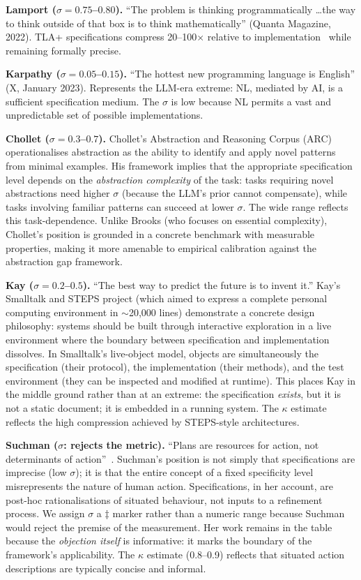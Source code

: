 \documentclass[11pt, a4paper, logo, copyright]{googledeepmind}
\begin{document}
\textbf{Lamport ($\sigma = 0.75$--$0.80$).} ``The problem is thinking programmatically \ldots the way to think outside of that box is to think mathematically'' (Quanta Magazine, 2022). TLA+ specifications compress 20--100$\times$ relative to implementation~\citep{newcombe2015amazon} while remaining formally precise.

\textbf{Karpathy ($\sigma = 0.05$--$0.15$).} ``The hottest new programming language is English'' (X, January 2023). Represents the LLM-era extreme: NL, mediated by AI, is a sufficient specification medium. The $\sigma$ is low because NL permits a vast and unpredictable set of possible implementations.

\textbf{Chollet ($\sigma = 0.3$--$0.7$).} Chollet's Abstraction and Reasoning Corpus (ARC)~\citep{chollet2019measure} operationalises abstraction as the ability to identify and apply novel patterns from minimal examples. His framework implies that the appropriate specification level depends on the \emph{abstraction complexity} of the task: tasks requiring novel abstractions need higher $\sigma$ (because the LLM's prior cannot compensate), while tasks involving familiar patterns can succeed at lower $\sigma$. The wide range reflects this task-dependence. Unlike Brooks (who focuses on essential complexity), Chollet's position is grounded in a concrete benchmark with measurable properties, making it more amenable to empirical calibration against the abstraction gap framework.

\textbf{Kay ($\sigma = 0.2$--$0.5$).} ``The best way to predict the future is to invent it.'' Kay's Smalltalk and STEPS project (which aimed to express a complete personal computing environment in $\sim$20,000 lines) demonstrate a concrete design philosophy: systems should be built through interactive exploration in a live environment where the boundary between specification and implementation dissolves. In Smalltalk's live-object model, objects are simultaneously the specification (their protocol), the implementation (their methods), and the test environment (they can be inspected and modified at runtime). This places Kay in the middle ground rather than at an extreme: the specification \emph{exists}, but it is not a static document; it is embedded in a running system. The $\kappa$ estimate reflects the high compression achieved by STEPS-style architectures.

\textbf{Suchman ($\sigma$: rejects the metric).} ``Plans are resources for action, not determinants of action''~\citep{suchman1987plans}. Suchman's position is not simply that specifications are imprecise (low $\sigma$); it is that the entire concept of a fixed specificity level misrepresents the nature of human action. Specifications, in her account, are post-hoc rationalisations of situated behaviour, not inputs to a refinement process. We assign $\sigma$ a $\ddagger$ marker rather than a numeric range because Suchman would reject the premise of the measurement. Her work remains in the table because the \emph{objection itself} is informative: it marks the boundary of the framework's applicability. The $\kappa$ estimate (0.8--0.9) reflects that situated action descriptions are typically concise and informal.
\end{document}

